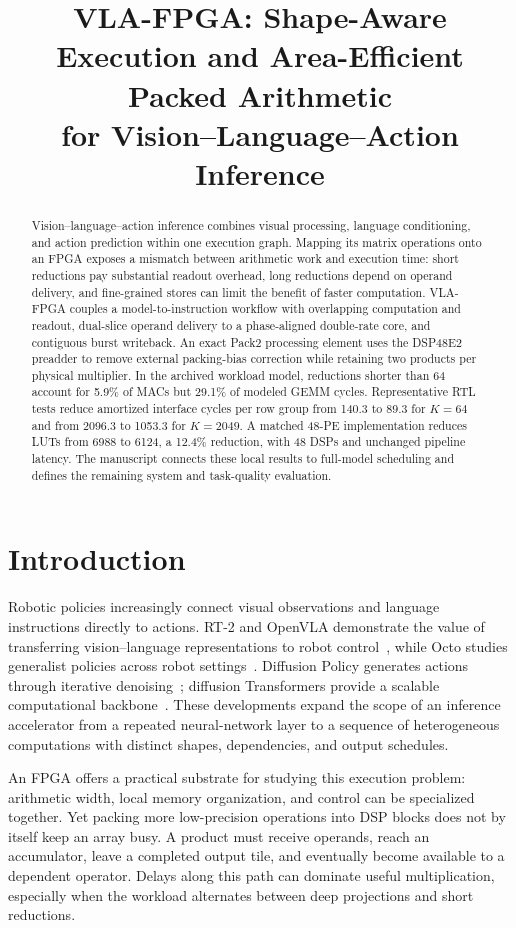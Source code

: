 \documentclass[10pt,conference,letterpaper]{IEEEtran}
\title{VLA-FPGA: Shape-Aware Execution and Area-Efficient Packed Arithmetic\protect\\for Vision--Language--Action Inference}
\author{\IEEEauthorblockN{Author information to be added}\IEEEauthorblockA{Working manuscript --- September 12, 2026}}
\begin{document}
\maketitle
\begin{abstract}
Vision--language--action inference combines visual processing, language conditioning, and action prediction within one execution graph. Mapping its matrix operations onto an FPGA exposes a mismatch between arithmetic work and execution time: short reductions pay substantial readout overhead, long reductions depend on operand delivery, and fine-grained stores can limit the benefit of faster computation. VLA-FPGA couples a model-to-instruction workflow with overlapping computation and readout, dual-slice operand delivery to a phase-aligned double-rate core, and contiguous burst writeback. An exact Pack2 processing element uses the DSP48E2 preadder to remove external packing-bias correction while retaining two products per physical multiplier. In the archived workload model, reductions shorter than 64 account for 5.9\% of MACs but 29.1\% of modeled GEMM cycles. Representative RTL tests reduce amortized interface cycles per row group from 140.3 to 89.3 for $K=64$ and from 2096.3 to 1053.3 for $K=2049$. A matched 48-PE implementation reduces LUTs from 6988 to 6124, a 12.4\% reduction, with 48 DSPs and unchanged pipeline latency. The manuscript connects these local results to full-model scheduling and defines the remaining system and task-quality evaluation.
\end{abstract}

\section{Introduction}
Robotic policies increasingly connect visual observations and language instructions directly to actions. RT-2 and OpenVLA demonstrate the value of transferring vision--language representations to robot control~\cite{rt2,openvla}, while Octo studies generalist policies across robot settings~\cite{octo}. Diffusion Policy generates actions through iterative denoising~\cite{diffpolicy}; diffusion Transformers provide a scalable computational backbone~\cite{dit}. These developments expand the scope of an inference accelerator from a repeated neural-network layer to a sequence of heterogeneous computations with distinct shapes, dependencies, and output schedules.

An FPGA offers a practical substrate for studying this execution problem: arithmetic width, local memory organization, and control can be specialized together. Yet packing more low-precision operations into DSP blocks does not by itself keep an array busy. A product must receive operands, reach an accumulator, leave a completed output tile, and eventually become available to a dependent operator. Delays along this path can dominate useful multiplication, especially when the workload alternates between deep projections and short reductions.
\end{document}
